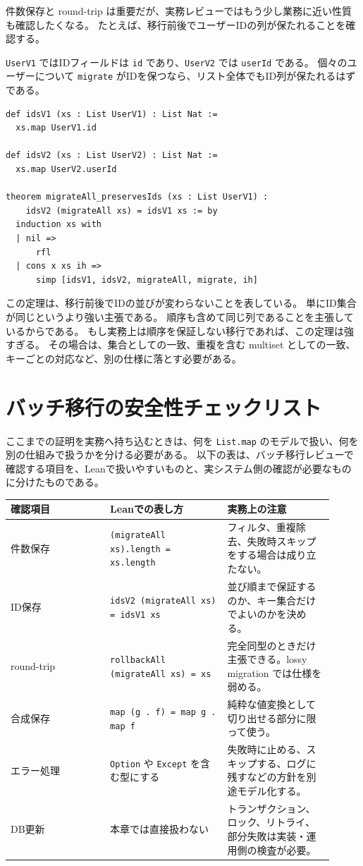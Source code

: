 件数保存と round-trip は重要だが、実務レビューではもう少し業務に近い性質も確認したくなる。
たとえば、移行前後でユーザーIDの列が保たれることを確認する。

\texttt{UserV1} ではIDフィールドは \texttt{id} であり、\texttt{UserV2} では \texttt{userId} である。
個々のユーザーについて \texttt{migrate} がIDを保つなら、リスト全体でもID列が保たれるはずである。

\begin{listing}[htbp]
\begin{verbatim}
def idsV1 (xs : List UserV1) : List Nat :=
  xs.map UserV1.id

def idsV2 (xs : List UserV2) : List Nat :=
  xs.map UserV2.userId

theorem migrateAll_preservesIds (xs : List UserV1) :
    idsV2 (migrateAll xs) = idsV1 xs := by
  induction xs with
  | nil =>
      rfl
  | cons x xs ih =>
      simp [idsV1, idsV2, migrateAll, migrate, ih]
\end{verbatim}
\caption{ID列の保存}
\label{lst:ch24-id-preservation}
\end{listing}

この定理は、移行前後でIDの並びが変わらないことを表している。
単にID集合が同じというより強い主張である。
順序も含めて同じ列であることを主張しているからである。
もし実務上は順序を保証しない移行であれば、この定理は強すぎる。
その場合は、集合としての一致、重複を含む multiset としての一致、キーごとの対応など、別の仕様に落とす必要がある。

\section{バッチ移行の安全性チェックリスト}

ここまでの証明を実務へ持ち込むときは、何を \texttt{List.map} のモデルで扱い、何を別の仕組みで扱うかを分ける必要がある。
以下の表は、バッチ移行レビューで確認する項目を、Leanで扱いやすいものと、実システム側の確認が必要なものに分けたものである。

\begin{longtable}{p{0.28\linewidth}p{0.33\linewidth}p{0.30\linewidth}}
\toprule
確認項目 & Leanでの表し方 & 実務上の注意 \\
\midrule
件数保存 & \texttt{(migrateAll xs).length = xs.length} & フィルタ、重複除去、失敗時スキップをする場合は成り立たない。 \\
ID保存 & \texttt{idsV2 (migrateAll xs) = idsV1 xs} & 並び順まで保証するのか、キー集合だけでよいのかを決める。 \\
round-trip & \texttt{rollbackAll (migrateAll xs) = xs} & 完全同型のときだけ主張できる。lossy migration では仕様を弱める。 \\
合成保存 & \texttt{map (g . f) = map g . map f} & 純粋な値変換として切り出せる部分に限って使う。 \\
エラー処理 & \texttt{Option} や \texttt{Except} を含む型にする & 失敗時に止める、スキップする、ログに残すなどの方針を別途モデル化する。 \\
DB更新 & 本章では直接扱わない & トランザクション、ロック、リトライ、部分失敗は実装・運用側の検査が必要。 \\
\bottomrule
\end{longtable}

